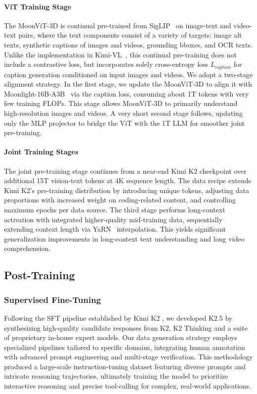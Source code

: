 \documentclass{article}
\newcommand{\citep}[1]{\parencite{#1}}
\begin{document}
\paragraph{ViT Training Stage}
The MoonViT-3D is continual pre-trained from SigLIP~\cite{zhai2023sigmoidlosslanguageimage} on image-text and video-text pairs, where the text components consist of a variety of targets: image alt texts, synthetic captions of images and videos, grounding bboxes, and OCR texts. Unlike the implementation in Kimi-VL~\cite{team2025kimivl}, this continual pre-training does not include a contrastive loss, but incorporates solely cross-entropy loss ${L}_{caption}$ for caption generation conditioned on input images and videos. We adopt a two-stage alignment strategy. In the first stage, we update the MoonViT-3D to align it with Moonlight-16B-A3B~\citep{liu2025muon} via the caption loss, consuming about 1T tokens with very few training FLOPs. This stage allows MoonViT-3D to primarily understand high-resolution images and videos. A very short second stage follows, updating only the MLP projector to bridge the ViT with the 1T LLM for smoother joint pre-training.

\paragraph{Joint Training Stages}
The joint pre-training stage continues from a near-end Kimi K2 checkpoint over additional 15T vision-text tokens at 4K sequence length. The data recipe extends Kimi K2's pre-training distribution by introducing unique tokens, adjusting data proportions with increased weight on coding-related content, and controlling maximum epochs per data source. The third stage performs long-context activation with integrated higher-quality mid-training data, sequentially extending context length via YaRN~\citep{peng2023yarn} interpolation. This yields significant generalization improvements in long-context text understanding and long video comprehension.

\subsection{Post-Training}
\subsubsection{Supervised Fine-Tuning}

Following the SFT pipeline established by Kimi K2 \citep{team2025kimik2}, we developed K2.5 by synthesizing high-quality candidate responses from K2, K2 Thinking and a suite of proprietary in-house expert models. Our data generation strategy employs specialized pipelines tailored to specific domains, integrating human annotation with advanced prompt engineering and multi-stage verification. 
This methodology produced a large-scale instruction-tuning dataset featuring diverse prompts and intricate reasoning trajectories, ultimately training the model to prioritize interactive reasoning and precise tool-calling for complex, real-world applications.
\end{document}
